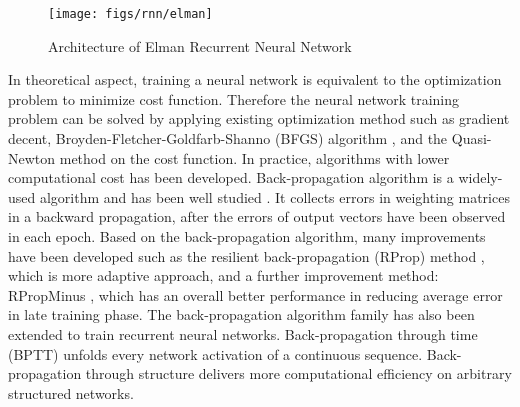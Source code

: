 \begin{figure}[t]
    \centering
    \texttt{[image: figs/rnn/elman]}
    \caption{Architecture of Elman Recurrent Neural Network}
    \label{fig:elman}
\end{figure}


In theoretical aspect, training a neural network is equivalent to the optimization problem to minimize cost function. Therefore the neural network training problem can be solved by applying existing optimization method such as gradient decent, Broyden-Fletcher-Goldfarb-Shanno (BFGS) algorithm
\cite{heath2010sci}, and the Quasi-Newton method on the cost function. In practice, algorithms with lower computational cost has been developed. Back-propagation algorithm is a widely-used algorithm and has been well studied \cite{hecht1988backprop}. It collects errors in weighting matrices in a backward propagation, after the errors of output vectors have been observed in each epoch. Based on the back-propagation algorithm, many improvements have been developed such as the resilient back-propagation (RProp) method \cite{riedmiller1993direct}, which is more adaptive approach, and a further improvement method: RPropMinus \cite{igel2003empirical}, which has an overall better performance in reducing average error in late training phase. The back-propagation algorithm family has also been extended to train recurrent neural networks. Back-propagation through time (BPTT) \cite{werbos1990backprop} unfolds every network activation of a
continuous sequence. Back-propagation through structure delivers more computational efficiency on
arbitrary structured networks.
